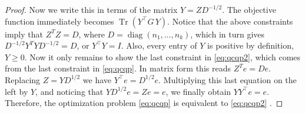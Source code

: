 \documentclass[aps,preprint,nofootinbib,floatfix]{revtex4-1}
\DeclareMathOperator{\diag}{diag}
\DeclareMathOperator{\Tr}{Tr}
\newcommand\e{e}
\begin{document}
\begin{proof}
Now we write this in terms of the matrix $Y = Z D^{-1/2}$.
The objective function immediately becomes
$\Tr\left( Y^\top G \, Y\right)$. Notice that the above constraints
imply that $Z^T Z = D$, where $D=\diag(n_1,\dotsc,n_k)$, which in turn gives
$D^{-1/2} Y^T Y D^{-1/2} = D$, or $Y^\top Y = I$. 
Also, every entry of $Y$ is positive by definition,
$Y \ge 0$. Now it only remains to show the last 
constraint in \eqref{eq:qcqp2}, which comes from the last
constraint in \eqref{eq:qcqp}. In matrix form this reads
$Z^T \e = D \e$. Replacing $Z=YD^{1/2}$ we have
$Y^\top \e = D^{1/2} \e$. Multiplying this last equation
on the left by $Y$, and noticing
that $Y D^{1/2} \e = Z \e = \e$, we finally obtain
$Y Y^\top \e = \e$. Therefore, the optimization 
problem \eqref{eq:qcqp} is equivalent
to \eqref{eq:qcqp2} .
\end{proof}
\end{document}
